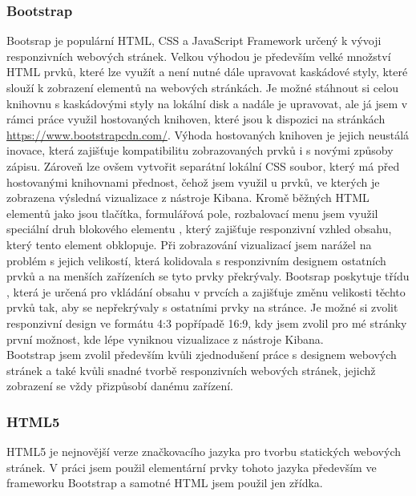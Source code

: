 \documentclass[czech,BP]{thesiskiv}
\begin{document}
\subsubsection{Bootstrap}
Bootsrap je populární HTML, CSS a JavaScript Framework určený k vývoji responzivních webových stránek.\cite{Bootsrap} Velkou výhodou je především velké množství HTML prvků, které lze využít a není nutné dále upravovat kaskádové styly, které slouží k zobrazení elementů na webových stránkách. Je možné stáhnout si celou knihovnu s kaskádovými styly na lokální disk a nadále je upravovat, ale já jsem v rámci práce využil hostovaných knihoven, které jsou k dispozici na stránkách \url{https://www.bootstrapcdn.com/}. Výhoda hostovaných knihoven je jejich neustálá inovace, která zajišťuje kompatibilitu zobrazovaných prvků i s novými způsoby zápisu. Zároveň lze ovšem vytvořit separátní lokální CSS soubor, který má před hostovanými knihovnami přednost, čehož jsem využil u prvků, ve kterých je zobrazena výsledná vizualizace z nástroje Kibana. Kromě běžných HTML elementů jako jsou tlačítka, formulářová pole, rozbalovací menu jsem využil speciální druh blokového elementu , který zajišťuje responzivní vzhled obsahu, který tento element obklopuje. Při zobrazování vizualizací jsem narážel na problém s jejich velikostí, která kolidovala s responzivním designem ostatních prvků a na menších zařízeních se tyto prvky překrývaly. Bootsrap poskytuje třídu , která je určená pro vkládání obsahu v prvcích  a zajišťuje změnu velikosti těchto prvků tak, aby se nepřekrývaly s ostatními prvky na stránce. Je možné si zvolit responzivní design ve formátu 4:3 popřípadě 16:9, kdy jsem zvolil pro mé stránky první možnost, kde lépe vyniknou vizualizace z nástroje Kibana.
\\
Bootstrap jsem zvolil především kvůli zjednodušení práce s designem webových stránek a také kvůli snadné tvorbě responzivních webových stránek, jejichž zobrazení se vždy přizpůsobí danému zařízení.
\subsubsection{HTML5}
HTML5 je nejnovější verze značkovacího jazyka pro tvorbu statických webových stránek. V práci jsem použil elementární prvky tohoto jazyka především ve frameworku Bootstrap a samotné HTML jsem použil jen zřídka.
\end{document}
